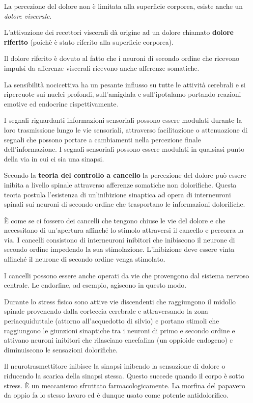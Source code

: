 \documentclass[]{article}
\begin{document}
La percezione del dolore non è limitata alla superficie corporea, esiste
anche un \emph{dolore viscerale}.

L'attivazione dei recettori viscerali dà origine ad un dolore chiamato
\textbf{dolore riferito} (poichè è stato riferito alla superficie
corporea).

Il dolore riferito è dovuto al fatto che i neuroni di secondo ordine che
ricevono impulsi da afferenze viscerali ricevono anche afferenze
somatiche.

La sensibilità nocicettiva ha un pesante influsso su tutte le attività
cerebrali e si ripercuote sui nuclei profondi, sull'amigdala e
sull'ipotalamo portando reazioni emotive ed endocrine rispettivamente.

I segnali riguardanti informazioni sensoriali possono essere modulati
durante la loro trasmissione lungo le vie sensoriali, attraverso
facilitazione o attenuazione di segnali che possono portare a
cambiamenti nella percezione finale dell'informazione. I segnali
sensoriali possono essere modulati in qualsiasi punto della via in cui
ci sia una sinapsi.

Secondo la \textbf{teoria del controllo a cancello} la percezione del
dolore può essere inibita a livello spinale attraverso afferenze
somatiche non dolorifiche. Questa teoria postula l'esistenza di
un'inibizione sinaptica ad opera di interneuroni spinali sui neuroni di
secondo ordine che trasportano le informazioni dolorifiche.

È come se ci fossero dei cancelli che tengono chiuse le vie del dolore e
che necessitano di un'apertura affinché lo stimolo attraversi il
cancello e percorra la via. I cancelli consistono di interneuroni
inibitori che inibiscono il neurone di secondo ordine impedendo la sua
stimolazione. L'inibizione deve essere vinta affinché il neurone di
secondo ordine venga stimolato.

I cancelli possono essere anche operati da vie che provengono dal
sistema nervoso centrale. Le endorfine, ad esempio, agiscono in questo
modo.

Durante lo stress fisico sono attive vie discendenti che raggiungono il
midollo spinale provenendo dalla corteccia cerebrale e attraversando la
zona periacquiduttale (attorno all'acquedotto di silvio) e portano
stimoli che raggiungono le giunzioni sinaptiche tra i neuroni di primo e
secondo ordine e attivano neuroni inibitori che rilasciano encefalina
(un oppioide endogeno) e diminuiscono le sensazioni dolorifiche.

Il neurotrasmettitore inibisce la sinapsi inibendo la sensazione di
dolore o riducendo la scarica della sinapsi stessa. Questo succede
quando il corpo è sotto stress. È un meccanismo sfruttato
farmacologicamente. La morfina del papavero da oppio fa lo stesso lavoro
ed è dunque usato come potente antidolorifico.
\end{document}
